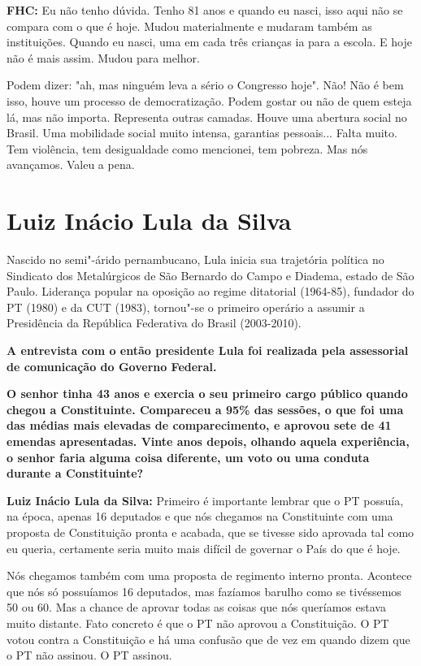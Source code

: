 \textbf{FHC:} Eu não tenho dúvida. Tenho 81 anos e quando eu nasci, isso
aqui não se compara com o que é hoje. Mudou materialmente e mudaram
também as instituições. Quando eu nasci, uma em cada três crianças ia
para a escola. E hoje não é mais assim. Mudou para melhor.

Podem dizer: "ah, mas ninguém leva a sério o Congresso hoje". Não! Não é
bem isso, houve um processo de democratização. Podem gostar ou não de
quem esteja lá, mas não importa. Representa outras camadas. Houve uma
abertura social no Brasil. Uma mobilidade social muito intensa,
garantias pessoais... Falta muito. Tem violência, tem desigualdade como
mencionei, tem pobreza. Mas nós avançamos. Valeu a pena.

\section{Luiz Inácio Lula da Silva}

Nascido no semi"-árido pernambucano, Lula inicia sua trajetória política
no Sindicato dos Metalúrgicos de São Bernardo do Campo e Diadema, estado
de São Paulo. Liderança popular na oposição ao regime ditatorial
(1964-85), fundador do PT (1980) e da CUT (1983), tornou"-se o primeiro
operário a assumir a Presidência da República Federativa do Brasil
(2003-2010).

\textbf{A entrevista com o então presidente Lula foi realizada pela
assessorial de comunicação do Governo Federal.}

\textbf{O senhor tinha 43 anos e exercia o seu primeiro cargo público
quando chegou a Constituinte. Compareceu a 95\% das sessões, o que foi
uma das médias mais elevadas de comparecimento, e aprovou sete de 41
emendas apresentadas. Vinte anos depois, olhando aquela experiência, o
senhor faria alguma coisa diferente, um voto ou uma conduta durante a
Constituinte?}

\textbf{Luiz Inácio Lula da Silva:} Primeiro é importante lembrar que o
PT possuía, na época, apenas 16 deputados e que nós chegamos na
Constituinte com uma proposta de Constituição pronta e acabada, que se
tivesse sido aprovada tal como eu queria, certamente seria muito mais
difícil de governar o País do que é hoje.

Nós chegamos também com uma proposta de regimento interno pronta.
Acontece que nós só possuíamos 16 deputados, mas fazíamos barulho como
se tivéssemos 50 ou 60. Mas a chance de aprovar todas as coisas que nós
queríamos estava muito distante. Fato concreto é que o PT não aprovou a
Constituição. O PT votou contra a Constituição e há uma confusão que de
vez em quando dizem que o PT não assinou. O PT assinou.

